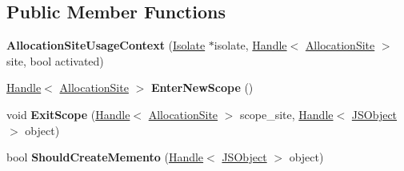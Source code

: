 \subsection*{Public Member Functions}
\begin{DoxyCompactItemize}
\item 
{\bfseries Allocation\+Site\+Usage\+Context} (\hyperlink{classv8_1_1internal_1_1_isolate}{Isolate} $\ast$isolate, \hyperlink{classv8_1_1internal_1_1_handle}{Handle}$<$ \hyperlink{classv8_1_1internal_1_1_allocation_site}{Allocation\+Site} $>$ site, bool activated)\hypertarget{classv8_1_1internal_1_1_allocation_site_usage_context_aa9b5b62dbc43c89fbb14b22f32d3f68e}{}\label{classv8_1_1internal_1_1_allocation_site_usage_context_aa9b5b62dbc43c89fbb14b22f32d3f68e}

\item 
\hyperlink{classv8_1_1internal_1_1_handle}{Handle}$<$ \hyperlink{classv8_1_1internal_1_1_allocation_site}{Allocation\+Site} $>$ {\bfseries Enter\+New\+Scope} ()\hypertarget{classv8_1_1internal_1_1_allocation_site_usage_context_a7155f90f38a179371cbd03d42d3311a4}{}\label{classv8_1_1internal_1_1_allocation_site_usage_context_a7155f90f38a179371cbd03d42d3311a4}

\item 
void {\bfseries Exit\+Scope} (\hyperlink{classv8_1_1internal_1_1_handle}{Handle}$<$ \hyperlink{classv8_1_1internal_1_1_allocation_site}{Allocation\+Site} $>$ scope\+\_\+site, \hyperlink{classv8_1_1internal_1_1_handle}{Handle}$<$ \hyperlink{classv8_1_1internal_1_1_j_s_object}{J\+S\+Object} $>$ object)\hypertarget{classv8_1_1internal_1_1_allocation_site_usage_context_a27c29c9de5fb9a5afdc56a262b7d095d}{}\label{classv8_1_1internal_1_1_allocation_site_usage_context_a27c29c9de5fb9a5afdc56a262b7d095d}

\item 
bool {\bfseries Should\+Create\+Memento} (\hyperlink{classv8_1_1internal_1_1_handle}{Handle}$<$ \hyperlink{classv8_1_1internal_1_1_j_s_object}{J\+S\+Object} $>$ object)\hypertarget{classv8_1_1internal_1_1_allocation_site_usage_context_a9b8b4f20046612a1dc28823efe000043}{}\label{classv8_1_1internal_1_1_allocation_site_usage_context_a9b8b4f20046612a1dc28823efe000043}

\end{DoxyCompactItemize}
